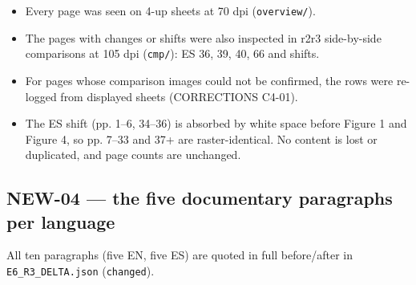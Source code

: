 \documentclass[
]{article}
\providecommand{\tightlist}{%
  \setlength{\itemsep}{0pt}\setlength{\parskip}{0pt}}
\begin{document}
\begin{itemize}
  \begin{itemize}
  \tightlist
  \item
    Every page was seen on 4-up sheets at 70 dpi (\texttt{overview/}).
  \item
    The pages with changes or shifts were also inspected in
    r2\textbar r3 side-by-side comparisons at 105 dpi (\texttt{cmp/}):
    ES 36, 39, 40, 66 and shifts.
  \item
    For pages whose comparison images could not be confirmed, the rows
    were re-logged from displayed sheets (CORRECTIONS C4-01).
  \item
    The ES shift (pp. 1--6, 34--36) is absorbed by white space before
    Figure 1 and Figure 4, so pp. 7--33 and 37+ are raster-identical. No
    content is lost or duplicated, and page counts are unchanged.
  \end{itemize}
\end{itemize}

\subsection{NEW-04 --- the five documentary paragraphs per
language}\label{new-04--the-five-documentary-paragraphs-per-language}

All ten paragraphs (five EN, five ES) are quoted in full before/after in
\texttt{E6\_R3\_DELTA.json} (\texttt{changed}).
\end{document}
